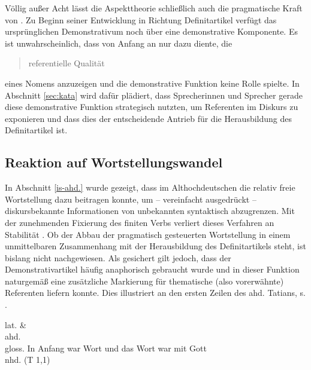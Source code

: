 Völlig außer Acht lässt die Aspekttheorie schließlich auch die pragmatische Kraft von . Zu Beginn seiner Entwicklung in Richtung Definitartikel verfügt das ursprünglichen Demonstrativum noch über eine demonstrative Komponente. Es ist unwahrscheinlich, dass  von Anfang an nur dazu diente, die \blockcquote[281]{Leiss2000}{referentielle Qualität} eines Nomens anzuzeigen und die demonstrative Funktion keine Rolle spielte. In Abschnitt \ref{sec:kata} wird dafür plädiert, dass Sprecherinnen und Sprecher gerade diese demonstrative Funktion strategisch nutzten, um Referenten im Diskurs zu exponieren und dass dies der entscheidende Antrieb für die Herausbildung des Definitartikel ist. 

\subsection{Reaktion auf Wortstellungswandel} \label{wortstellungswandel}

In Abschnitt \ref{is-ahd.} wurde gezeigt, dass im Althochdeutschen die relativ freie Wortstellung dazu beitragen konnte, um -- vereinfacht ausgedrückt -- diskursbekannte Informationen von unbekannten syntaktisch abzugrenzen. Mit der zunehmenden Fixierung des finiten Verbs verliert dieses Verfahren an Stabilität \parencite{Hinterholzl2010}. Ob der Abbau der pragmatisch gesteuerten Wortstellung in einem unmittelbaren Zusammenhang mit der Herausbildung des Definitartikels steht, ist bislang nicht nachgewiesen. Als gesichert gilt jedoch, dass der Demonstrativartikel häufig anaphorisch gebraucht wurde \parencite{Jager1918, Oubouzar1992} und in dieser Funktion naturgemäß eine zusätzliche Markierung für thematische (also vorerwähnte) Referenten liefern konnte. Dies illustriert \textcite[161]{Leiss2000} an den ersten Zeilen des ahd. Tatians, s. .

\begin{exe} 
\ex \label{ex:wort} 
\glll lat.      \& {}    \\
	ahd.           \\
	gloss. In Anfang war Wort und das Wort war mit Gott \\
	\trans nhd.   (T 1,1)
	\end{exe}

